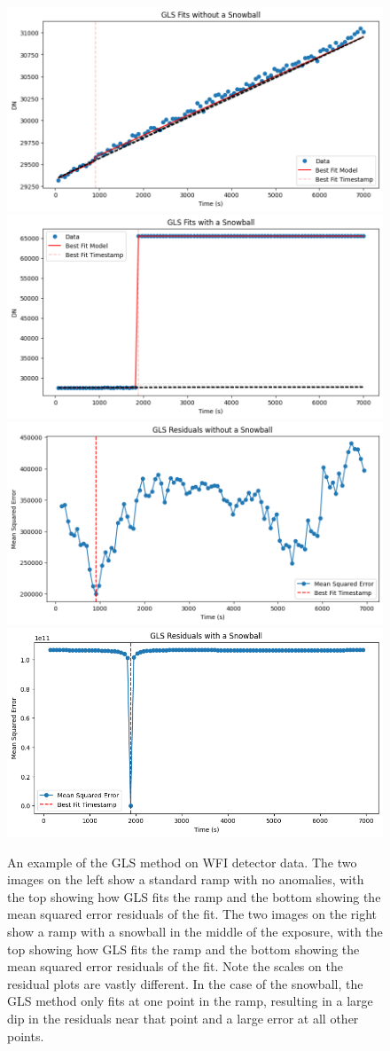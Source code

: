\begin{figure}
    \centering
    \includegraphics[width=.49\linewidth]{figs/rst/gls_good.png}
    \includegraphics[width=.49\linewidth]{figs/rst/gls_bad.png}
    \includegraphics[width=.49\linewidth]{figs/rst/gls_good_res.png}
    \includegraphics[width=.49\linewidth]{figs/rst/gls_bad_res.png}
    \caption[Example of the GLS Method on WFI Detector Data]{
        An example of the GLS method on WFI detector data.
        The two images on the left show a standard ramp with no anomalies, with the top showing how GLS fits the ramp and the bottom showing the mean squared error residuals of the fit.
        The two images on the right show a ramp with a snowball in the middle of the exposure, with the top showing how GLS fits the ramp and the bottom showing the mean squared error residuals of the fit.
        Note the scales on the residual plots are vastly different.
        In the case of the snowball, the GLS method only fits at one point in the ramp, resulting in a large dip in the residuals near that point and a large error at all other points.
    }
    \label{rst/fig:jwst_gls}
\end{figure}

